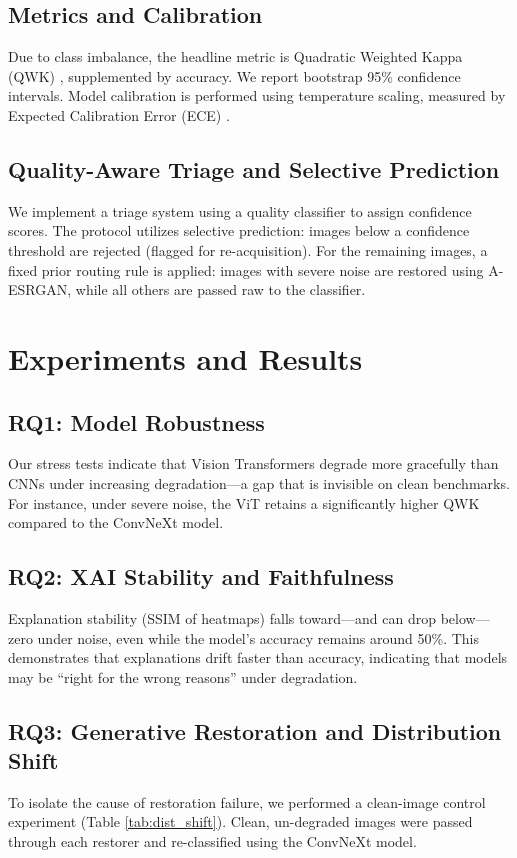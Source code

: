 \documentclass[conference]{IEEEtran}
\begin{document}
\subsection{Metrics and Calibration}
Due to class imbalance, the headline metric is Quadratic Weighted Kappa (QWK) \cite{cohen1968kappa}, supplemented by accuracy. We report bootstrap 95\% confidence intervals. Model calibration is performed using temperature scaling, measured by Expected Calibration Error (ECE) \cite{guo2017calibration}.

\subsection{Quality-Aware Triage and Selective Prediction}
We implement a triage system using a quality classifier to assign confidence scores. The protocol utilizes selective prediction: images below a confidence threshold are rejected (flagged for re-acquisition). For the remaining images, a fixed prior routing rule is applied: images with severe noise are restored using A-ESRGAN, while all others are passed raw to the classifier.

\section{Experiments and Results}

\subsection{RQ1: Model Robustness}
Our stress tests indicate that Vision Transformers degrade more gracefully than CNNs under increasing degradation---a gap that is invisible on clean benchmarks. For instance, under severe noise, the ViT retains a significantly higher QWK compared to the ConvNeXt model.

\subsection{RQ2: XAI Stability and Faithfulness}
Explanation stability (SSIM of heatmaps) falls toward---and can drop below---zero under noise, even while the model's accuracy remains around 50\%. This demonstrates that explanations drift faster than accuracy, indicating that models may be ``right for the wrong reasons'' under degradation.

\subsection{RQ3: Generative Restoration and Distribution Shift}
To isolate the cause of restoration failure, we performed a clean-image control experiment (Table \ref{tab:dist_shift}). Clean, un-degraded images were passed through each restorer and re-classified using the ConvNeXt model.
\end{document}

